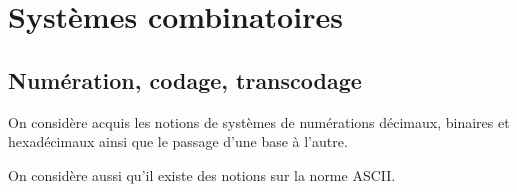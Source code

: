 \setchapterpreamble[u]{\margintoc}

\chapter{Systèmes combinatoires}

%
%
%
%
%
%
%
%
%
%
%
%
%
%
%
%
%
%
%
%
%
%
%
%
%
%
%

\section{Numération, codage, transcodage}
\begin{rem}
On considère acquis les notions de systèmes de numérations décimaux, binaires et hexadécimaux ainsi que le passage d'une base à l'autre.

On considère aussi qu'il existe des notions sur la norme ASCII. 
\end{rem}

